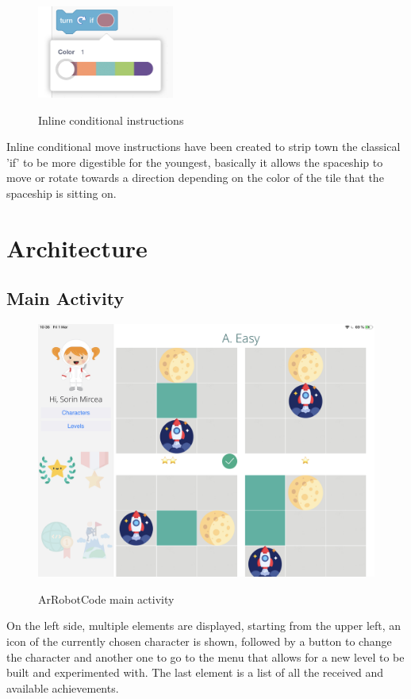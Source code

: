 \documentclass[12 pct]{report}
\begin{document}
\begin{figure}[H]
\includegraphics[width=0.4\textwidth]{newIf}
\centering
\label{fig:hololens}
\caption{Inline conditional instructions}
\end{figure}

Inline conditional move instructions have been created to strip town the classical 'if'  to be more digestible for the youngest, basically it allows the spaceship to move or rotate towards a direction depending on the color of the tile that the spaceship is sitting on.
\section{Architecture}

\subsection*{Main Activity}
\begin{figure}[H]
\includegraphics[width=1.0\textwidth]{ArRobotCode0}
\centering
\label{fig:hololens}
\caption{ArRobotCode main activity}
\end{figure}

On the left side, multiple elements are displayed, starting from the upper left, an icon of the currently chosen character is shown, followed by a button to change the character and another one to go to the menu that allows for a new level to be built and experimented with. The last element is a list of all the received and available achievements.
\end{document}
